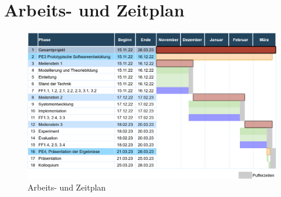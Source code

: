 \section{Arbeits- und Zeitplan}

\begin{figure}[h]
    \centering
    \includegraphics[width=\textwidth]{pictures/zeitplan2.png}
    \caption{Arbeits- und Zeitplan}
    \label{fig:zeitplan}
\end{figure}

